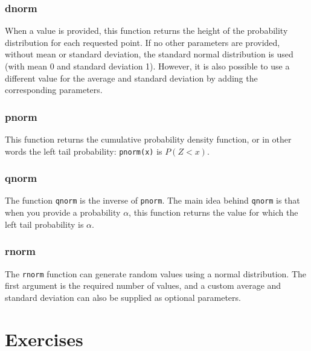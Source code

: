 \subsubsection{dnorm}

When a value is provided, this function returns the height of the probability distribution for each requested point.
If no other parameters are provided, without mean or standard deviation, the standard normal distribution is used (with mean 0 and standard deviation 1).
However, it is also possible to use a different value for the average and standard deviation by adding the corresponding parameters.



\subsubsection{pnorm}

This function returns the cumulative probability density function, or in other words the left tail probability: \texttt{pnorm(x)} is $P(Z < x)$.

\subsubsection{qnorm}
The function \texttt{qnorm} is the inverse of \texttt{pnorm}.
The main idea behind \texttt{qnorm} is that when you provide a probability $\alpha$, 
this function returns the value for which the left tail probability is $\alpha$.



\subsubsection{rnorm}

The \texttt{rnorm} function can generate random values using a normal distribution.
The first argument is the required number of values, and a custom average and standard deviation can also be supplied as optional parameters.



\section{Exercises}
\label{sec:sampling-exercises}

